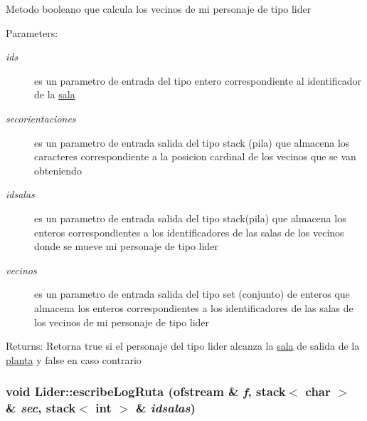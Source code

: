 Metodo booleano que calcula los vecinos de mi personaje de tipo lider \begin{Desc}
\item[Parameters:]
\begin{description}
\item[{\em ids}]es un parametro de entrada del tipo entero correspondiente al identificador de la \hyperlink{classsala}{sala} \item[{\em secorientaciones}]es un parametro de entrada salida del tipo stack (pila) que almacena los caracteres correspondiente a la posicion cardinal de los vecinos que se van obteniendo \item[{\em idsalas}]es un parametro de entrada salida del tipo stack(pila) que almacena los enteros correspondientes a los identificadores de las salas de los vecinos donde se mueve mi personaje de tipo lider \item[{\em vecinos}]es un parametro de entrada salida del tipo set (conjunto) de enteros que almacena los enteros correspondientes a los identificadores de las salas de los vecinos de mi personaje de tipo lider\end{description}
\end{Desc}
\begin{Desc}
\item[Returns:]Retorna true si el personaje del tipo lider alcanza la \hyperlink{classsala}{sala} de salida de la \hyperlink{classplanta}{planta} y false en caso contrario \end{Desc}
\hypertarget{classLider_4643215eb946b9bd002d6882c5a24aeb}{
\subsubsection[escribeLogRuta]{\setlength{\rightskip}{0pt plus 5cm}void Lider::escribeLogRuta (ofstream \& {\em f}, \/  stack$<$ char $>$ \& {\em sec}, \/  stack$<$ int $>$ \& {\em idsalas})}}
\label{classLider_4643215eb946b9bd002d6882c5a24aeb}


